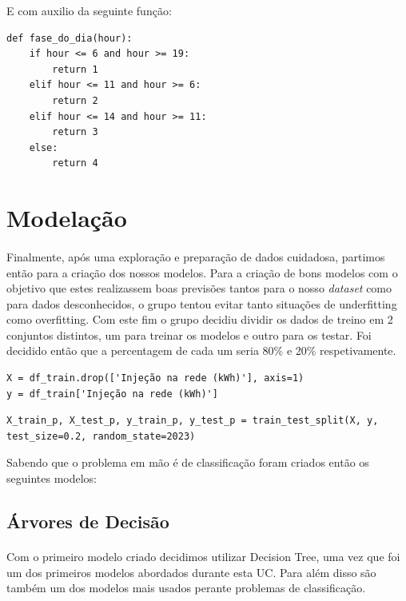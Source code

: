 E com auxilio da seguinte função:
\begin{verbatim}
def fase_do_dia(hour):
    if hour <= 6 and hour >= 19:
        return 1
    elif hour <= 11 and hour >= 6:
        return 2
    elif hour <= 14 and hour >= 11:
        return 3
    else:
        return 4
\end{verbatim}

\section{Modelação}
\paragraph{}
Finalmente, após uma exploração e preparação de dados cuidadosa, partimos então para a criação dos nossos modelos. Para a criação de bons modelos com o objetivo que estes realizassem boas previsões tantos para o nosso \textit{dataset} como para dados desconhecidos, o grupo tentou evitar tanto situações de underfitting como overfitting.
Com este fim o grupo decidiu dividir os dados de treino em 2 conjuntos distintos, um para treinar os modelos e outro para os testar. Foi decidido então que a percentagem de cada um seria 80\% e 20\% respetivamente.

\begin{verbatim}
X = df_train.drop(['Injeção na rede (kWh)'], axis=1)
y = df_train['Injeção na rede (kWh)']
\end{verbatim}

\begin{verbatim}
X_train_p, X_test_p, y_train_p, y_test_p = train_test_split(X, y, test_size=0.2, random_state=2023)
\end{verbatim}

Sabendo que o problema em mão é de classificação foram criados então os seguintes modelos:

\subsection{Árvores de Decisão}
\paragraph{}
Com o primeiro modelo criado decidimos utilizar Decision Tree, uma vez que foi um dos primeiros modelos abordados durante esta UC. Para além disso são também um dos modelos mais usados perante problemas de classificação.

